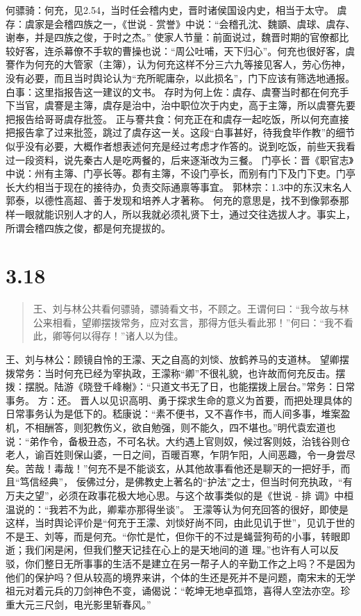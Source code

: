 \documentclass[]{book}
\begin{document}
何骠骑：何充，见2.54，当时任会稽内史，晋时诸侯国设内史，相当于太守。
虞存：虞家是会稽四族之一，《世说 -
赏誉》中说：``会稽孔沈、魏顗、虞球、虞存、谢奉，并是四族之俊，于时之杰。''
使家人节量：前面说过，魏晋时期的官僚都比较好客，连杀幕僚不手软的曹操也说：``周公吐哺，天下归心''。何充也很好客，虞謇作为何充的大管家（主簿），认为何充这样不分三六九等接见客人，劳心伤神，没有必要，而且当时舆论认为``充所昵庸杂，以此损名''，门下应该有筛选地通报。
白事：这里指报告这一建议的文书。
存时为何上佐：虞存、虞謇当时都在何充手下当官，虞謇是主簿，虞存是治中，治中职位次于内史，高于主簿，所以虞謇先要把报告给哥哥虞存批签。
正与謇共食：何充正在和虞存一起吃饭，所以何充直接把报告拿了过来批签，跳过了虞存这一关。这段``白事甚好，待我食毕作教''的细节似乎没有必要，大概作者想表述何充是经过考虑才作答的。说到吃饭，前些天我看过一段资料，说先秦古人是吃两餐的，后来逐渐改为三餐。
门亭长：晋《职官志》中说：州有主簿、门亭长等。郡有主簿，不设门亭长，而别有门下及门下吏。门亭长大约相当于现在的接待办，负责交际通禀等事宜。
郭林宗：1.3中的东汉末名人郭泰，以德性高超、善于发现和培养人才著称。
何充的意思是，找不到像郭泰那样一眼就能识别人才的人，所以我就必须礼贤下士，通过交往选拔人才。事实上，所谓会稽四族之俊，都是何充提拔的。

\section{3.18}\label{section-172}

\begin{quote}
王、刘与林公共看何骠骑，骠骑看文书，不顾之。王谓何曰：``我今故与林公来相看，望卿摆拨常务，应对玄言，那得方低头看此邪！''何曰：``我不看此，卿等何以得存！''诸人以为佳。
\end{quote}

王、刘与林公：顾镜自怜的王濛、天之自高的刘惔、放鹤养马的支道林。
望卿摆拨常务：当时何充已经为宰执政，王濛称``卿''不很礼貌，也许故而何充反击。摆拨：摆脱。陆游《晓登千峰榭》：``只道文书无了日，也能摆拨上层台。''常务：日常事务。
方：还。
晋人以见识高明、勇于探求生命的意义为首要，而把处理具体的日常事务认为是低下的。嵇康说：``素不便书，又不喜作书，而人间多事，堆案盈机，不相酬答，则犯教伤义，欲自勉强，则不能久，四不堪也。''明代袁宏道也说：``弟作令，备极丑态，不可名状。大约遇上官则奴，候过客则妓，治钱谷则仓老人，谕百姓则保山婆，一日之间，百暖百寒，乍阴乍阳，人间恶趣，令一身尝尽矣。苦哉！毒哉！''何充不是不能谈玄，从其他故事看他还是聊天的一把好手，而且``笃信经典''，
佞佛过分，是佛教史上著名的``护法''之士，但当时何充执政，``有万夫之望''，必须在政事花极大地心思。与这个故事类似的是《世说
- 排 调》中桓温说的：``我若不为此，卿辈亦那得坐谈''。
王濛等认为何充回答的很好，即使是这样，当时舆论评价是``何充于王濛、刘惔好尚不同，由此见讥于世''，见讥于世的不是王、刘等，而是何充。``你忙是忙，但你干的不过是蝇营狗苟的小事，转眼即逝；我们闲是闲，但我们整天记挂在心上的是天地间的道
理。''也许有人可以反驳，你们整日无所事事的生活不是建立在另一帮子人的辛勤工作之上吗？不是因为他们的保护吗？但从较高的境界来讲，个体的生还是死并不是问题，南宋末的无学祖元对着元兵的刀剑神色不变，诵偈说：``乾坤无地卓孤筇，喜得人空法亦空。珍重大元三尺剑，电光影里斩春风。''
\end{document}
